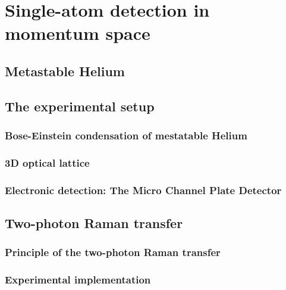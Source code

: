 \chapter{Single-atom detection in momentum space}

\section{Metastable Helium}

\section{The experimental setup}

\subsection{Bose-Einstein condensation of mestatable Helium}

\subsection{3D optical lattice}

\subsection{Electronic detection: The Micro Channel Plate Detector}

\section{Two-photon Raman transfer}

\subsection{Principle of the two-photon Raman transfer}

\subsection{Experimental implementation}
